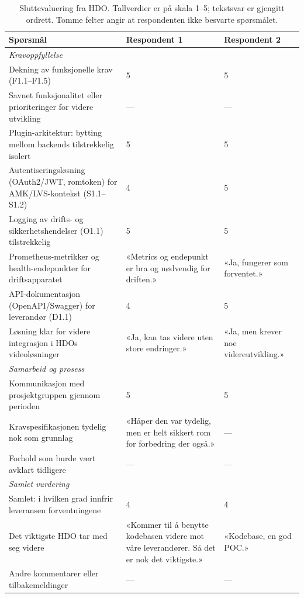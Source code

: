 \begin{table}[!htbp]
    \centering
    \footnotesize
    \renewcommand{\arraystretch}{1.25}
    \caption{Sluttevaluering fra HDO. Tallverdier er på skala
    1--5; tekstsvar er gjengitt ordrett. Tomme felter angir at
    respondenten ikke besvarte spørsmålet.}
    \label{tab:hdo-eval-full}
    \begin{tabular}{p{6.2cm} p{4.0cm} p{4.0cm}}
        \toprule
        \textbf{Spørsmål} & \textbf{Respondent 1} &
        \textbf{Respondent 2} \\
        \midrule
        \multicolumn{3}{l}{\textit{Kravoppfyllelse}} \\
        \midrule
        Dekning av funksjonelle krav (F1.1--F1.5) &
        5 & 5 \\
        Savnet funksjonalitet eller prioriteringer for videre
        utvikling &
        --- & --- \\
        Plugin-arkitektur: bytting mellom backends tilstrekkelig
        isolert &
        5 & 5 \\
        Autentiseringsløsning (OAuth2/JWT, romtoken) for
        AMK/LVS-kontekst (S1.1--S1.2) &
        4 & 5 \\
        Logging av drifts- og sikkerhetshendelser (O1.1)
        tilstrekkelig &
        5 & 5 \\
        Prometheus-metrikker og health-endepunkter for
        driftsapparatet &
        «Metrics og endepunkt er bra og nødvendig for driften.» &
        «Ja, fungerer som forventet.» \\
        API-dokumentasjon (OpenAPI/Swagger) for leverandør
        (D1.1) &
        4 & 5 \\
        Løsning klar for videre integrasjon i HDOs
        videoløsninger &
        «Ja, kan tas videre uten store endringer.» &
        «Ja, men krever noe videreutvikling.» \\
        \midrule
        \multicolumn{3}{l}{\textit{Samarbeid og prosess}} \\
        \midrule
        Kommunikasjon med prosjektgruppen gjennom perioden &
        5 & 5 \\
        Kravspesifikasjonen tydelig nok som grunnlag &
        «Håper den var tydelig, men er helt sikkert rom for
        forbedring der også.» &
        --- \\
        Forhold som burde vært avklart tidligere &
        --- & --- \\
        \midrule
        \multicolumn{3}{l}{\textit{Samlet vurdering}} \\
        \midrule
        Samlet: i hvilken grad innfrir leveransen
        forventningene &
        4 & 4 \\
        Det viktigste HDO tar med seg videre &
        «Kommer til å benytte kodebasen videre mot våre
        leverandører. Så det er nok det viktigste.» &
        «Kodebase, en god POC.» \\
        Andre kommentarer eller tilbakemeldinger &
        --- & --- \\
        \bottomrule
    \end{tabular}
\end{table}

